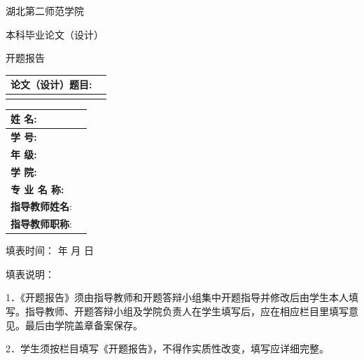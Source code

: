 \documentclass[
]{article}
\author{}
\date{}
\newcounter{none} %
\begin{document}
湖北第二师范学院

本科毕业论文（设计）

开题报告

{\def\LTcaptype{none} %
\begin{longtable}[]{@{}
  >{\raggedright\arraybackslash}p{}
  >{\raggedright\arraybackslash}p{}@{}}
\toprule\noalign{}
\begin{minipage}[b]{\linewidth}\raggedright
\textbf{论文（设计）题目:}
\end{minipage} & \begin{minipage}[b]{\linewidth}\centering
\end{minipage} \\
\midrule\noalign{}
\endhead
\bottomrule\noalign{}
\endlastfoot
& \\
\end{longtable}
}

{\def\LTcaptype{none} %
\begin{longtable}[]{@{}
  >{\raggedright\arraybackslash}p{}
  >{\centering\arraybackslash}p{}@{}}
\toprule\noalign{}
\begin{minipage}[b]{\linewidth}\raggedright
\textbf{姓 名:}
\end{minipage} & \begin{minipage}[b]{\linewidth}\centering
\end{minipage} \\
\midrule\noalign{}
\endhead
\bottomrule\noalign{}
\endlastfoot
\textbf{学 号:} & \\
\textbf{年 级:} & \\
\textbf{学 院:} & \\
\textbf{专 业 名 称:} & \\
\textbf{指导教师姓名}: & \\
\textbf{指导教师职称}: & \\
\end{longtable}
}

填表时间： 年 月 日

填表说明：

1．《开题报告》须由指导教师和开题答辩小组集中开题指导并修改后由学生本人填写。指导教师、开题答辩小组及学院负责人在学生填写后，应在相应栏目里填写意见。最后由学院盖章备案保存。

2．学生须按栏目填写《开题报告》，不得作实质性改变，填写应详细完整。
\end{document}
